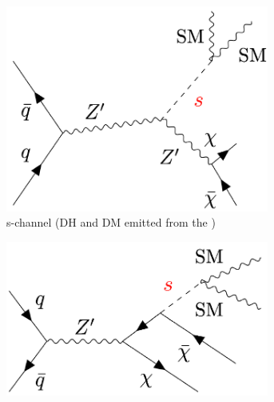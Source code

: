 \begin{figure}[hp]
	\centering
	\begin{subfigure}[t]{0.49\textwidth}
	\centering
	\includegraphics[width=0.95\textwidth]{Figures/2/Fey1.pdf}
%
%
%
%
%
%
	\caption{s-channel (DH and DM emitted from the \Zprime)}
	\label{fig:dh_schannel_1}
	\end{subfigure}
		\begin{subfigure}[t]{0.45\textwidth}
	\centering
	\includegraphics[width=0.95\textwidth]{Figures/2/Fey2.pdf}

\end{subfigure}
\end{figure}
